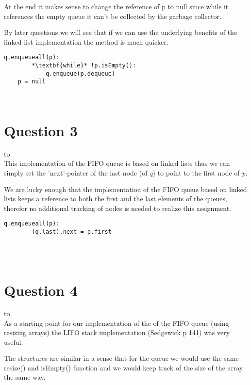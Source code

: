 \documentclass[a4paper]{article}
\def\headline#1{\hbox to \hsize{\hrulefill\quad\lower.3em\hbox{#1}\quad\hrulefill}}
\begin{document}
At the end it makes sense to change the reference of p to null since while it references the empty queue it can't be collected by the garbage collector. 

By later questions we will see that if we can use the underlying benefits of the linked list implementation the method is much quicker.
 \\

\noindent

\begin{lstlisting}[escapeinside={{*}{*}}]
    q.enqueueall(p):
        *\textbf{while}* !p.isEmpty():
            q.enqueue(p.dequeue)
    p = null
\end{lstlisting}

\ \\
\section*{Question 3}
\headline{-} \ \\
This implementation of the FIFO queue is based on linked lists thus we can simply set the 
'next'-pointer of the last node (of \textit{q}) to point to the first node of \textit{p}.

We are lucky enough that the implementation of the FIFO queue based on linked lists keeps a reference to both the first and the last elements of the queues, therefor no additional tracking of nodes is needed to realize this assignment.
 \\

\noindent

\begin{lstlisting}[escapeinside={{*}{*}}]
    q.enqueueall(p):
        (q.last).next = p.first
\end{lstlisting}
 
\ \\

\ \\
\section*{Question 4}
\headline{-} \ \\

As a starting point for our implementation of the  of the FIFO queue (using resizing arrays) the LIFO stack implementation (Sedgewick p 141) was very useful.

The structures are similar in a sense that for the queue we would use the same resize() and isEmpty() function and we would keep track of the size of the array the same way.
\end{document}
